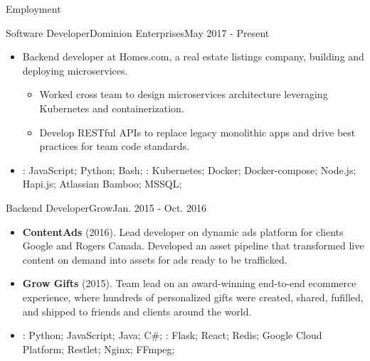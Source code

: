 \documentclass[]{mcdowellcv}
\begin{document}
    \makeheader

    \begin{cvsection}{Employment}

        \begin{cvsubsection}{Software Developer}{Dominion Enterprises}{May 2017 - Present}
            \begin{itemize}
                \item Backend developer at Homes.com, a real estate listings company, building and deploying microservices.
                \begin{itemize}
                    \item Worked cross team to design microservices architecture leveraging Kubernetes and containerization.
                    \item Develop RESTful APIs to replace legacy monolithic apps and drive best practices for team code standards.  
                \end{itemize}
            \end{itemize}
            \begin{itemize}
                 \item {}: JavaScript; Python; Bash;  \newline
                : Kubernetes; Docker; Docker-compose; Node.js; Hapi.js; Atlassian Bamboo; MSSQL;
            \end{itemize}
        \end{cvsubsection}

        \begin{cvsubsection}{Backend Developer}{Grow}{Jan. 2015 - Oct. 2016}
            \begin{itemize}
                \item \textbf{ContentAds} (2016). Lead developer on dynamic ads platform for clients Google and Rogers Canada. Developed an asset pipeline that transformed live content on demand into assets for ads ready to be trafficked.
            \end{itemize}
            \begin{itemize}
                \item \textbf{Grow Gifts} (2015). Team lead on an award-winning end-to-end ecommerce experience, where hundreds of personalized gifts were created, shared, fufilled, and shipped to friends and clients around the world.
            \end{itemize}
            \begin{itemize}
                 \item {}: Python; JavaScript; Java; C\#; \newline
                : Flask; React; Redis; Google Cloud Platform; Restlet; Nginx; FFmpeg;
            \end{itemize}
        \end{cvsubsection}


\end{cvsection}
\end{document}
